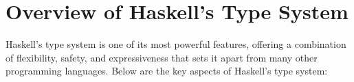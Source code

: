 %
%
%
%
%

\section{Overview of Haskell's Type System}

Haskell's type system is one of its most powerful features, offering a combination of flexibility, safety, and expressiveness that sets it apart from many other programming languages. Below are the key aspects of Haskell's type system:

